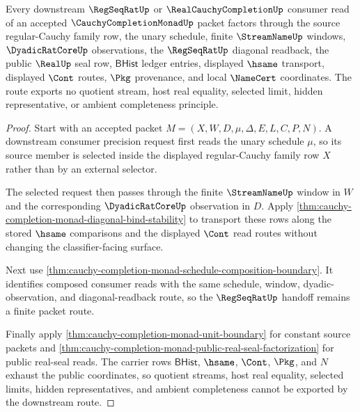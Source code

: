 \begin{theorem}
\label{thm:cauchy-completion-monad-downstream-regseqrat-consumer-route}
Every downstream $\RegSeqRatUp$ or $\RealCauchyCompletionUp$ consumer read of an accepted $\CauchyCompletionMonadUp$ packet factors through the source regular-Cauchy family row, the unary schedule, finite $\StreamNameUp$ windows, $\DyadicRatCoreUp$ observations, the $\RegSeqRatUp$ diagonal readback, the public $\RealUp$ seal row, $\mathsf{BHist}$ ledger entries, displayed $\hsame$ transport, displayed $\Cont$ routes, $\Pkg$ provenance, and local $\NameCert$ coordinates. The route exports no quotient stream, host real equality, selected limit, hidden representative, or ambient completeness principle.
\end{theorem}
\begin{proof}
Start with an accepted packet $M=(X,W,D,\mu,\Delta,E,L,C,P,N)$. A downstream consumer precision request first reads the unary schedule $\mu$, so its source member is selected inside the displayed regular-Cauchy family row $X$ rather than by an external selector.

The selected request then passes through the finite $\StreamNameUp$ window in $W$ and the corresponding $\DyadicRatCoreUp$ observation in $D$. Apply \autoref{thm:cauchy-completion-monad-diagonal-bind-stability} to transport these rows along the stored $\hsame$ comparisons and the displayed $\Cont$ read routes without changing the classifier-facing surface.

Next use \autoref{thm:cauchy-completion-monad-schedule-composition-boundary}. It identifies composed consumer reads with the same schedule, window, dyadic-observation, and diagonal-readback route, so the $\RegSeqRatUp$ handoff remains a finite packet route.

Finally apply \autoref{thm:cauchy-completion-monad-unit-boundary} for constant source packets and \autoref{thm:cauchy-completion-monad-public-real-seal-factorization} for public real-seal reads. The carrier rows $\mathsf{BHist}$, $\hsame$, $\Cont$, $\Pkg$, and $N$ exhaust the public coordinates, so quotient streams, host real equality, selected limits, hidden representatives, and ambient completeness cannot be exported by the downstream route.
\end{proof}

